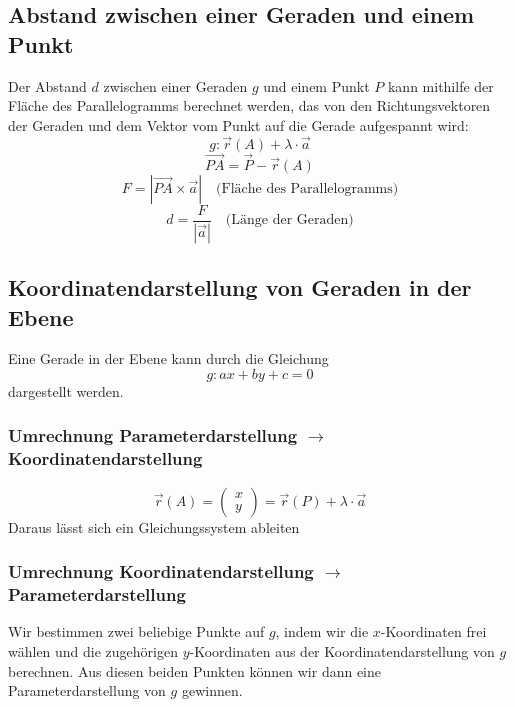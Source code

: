\documentclass{article}
\begin{document}
\begin{minipage}[t]{0.45\textwidth}
    \subsection*{Abstand zwischen einer Geraden und einem Punkt}
    Der Abstand \( d \) zwischen einer Geraden \( g \) und einem Punkt \( P \) kann mithilfe der Fläche des Parallelogramms berechnet werden, 
    das von den Richtungsvektoren der Geraden und dem Vektor vom Punkt auf die Gerade aufgespannt wird:
    \begin{equation*}
        g: \vec{r}(A) + \lambda \cdot \vec{a}
    \end{equation*}
    \begin{equation*}
        \overrightarrow{PA} = \vec{P} - \vec{r}(A)
    \end{equation*}
    \begin{equation*}
        F = |\overrightarrow{PA} \times \vec{a}|
        \quad \text{(Fläche des Parallelogramms)}
    \end{equation*}
    \begin{equation*}
        d = \frac{F}{|\vec{a}|}
        \quad \text{(Länge der Geraden)}
    \end{equation*}
\end{minipage}

\begin{minipage}[t]{0.45\textwidth}
    \subsection*{Koordinatendarstellung von Geraden in der Ebene}
    Eine Gerade in der Ebene kann durch die Gleichung
    \begin{equation*}
        g: ax + by + c = 0
    \end{equation*}
    dargestellt werden.
    \subsubsection*{Umrechnung Parameterdarstellung $\to$ Koordinatendarstellung}
    \begin{equation*}
        \vec{r}(A) = \begin{pmatrix}
        x \\
        y
        \end{pmatrix} = \vec{r}(P) + \lambda \cdot \vec{a}
    \end{equation*}
    Daraus lässt sich ein Gleichungssystem ableiten
\end{minipage}
\hfill
\begin{minipage}[t]{0.45\textwidth}
    \subsubsection*{Umrechnung Koordinatendarstellung $\to$ Parameterdarstellung}
    Wir bestimmen zwei beliebige Punkte auf $g$, indem wir die $x$-Koordinaten frei wählen und die
zugehörigen $y$-Koordinaten aus der Koordinatendarstellung von $g$ berechnen. Aus diesen beiden
Punkten können wir dann eine Parameterdarstellung von $g$ gewinnen.
\end{minipage}
\end{document}
